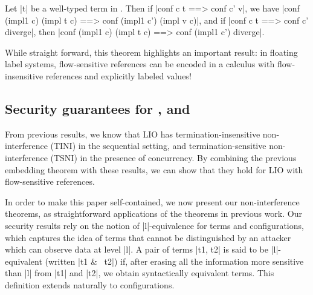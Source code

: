 


\begin{theorem}
\label{thm:eq} Let |t| be a well-typed term in \liofs{}.
  Then if |conf c t ==> conf c' v|, we have |conf (impl1 c) (impl t c)
  ==> conf (impl1 c') (impl v c)|, and if 
  |conf c t ==> conf c' diverge|, then
  |conf (impl1 c) (impl t c) ==> conf (impl1 c') diverge|.
\end{theorem}
While straight forward, this theorem highlights an important result: in
floating label systems, flow-sensitive references can be encoded in a calculus
with flow-insensitive references and explicitly labeled values!

\subsection{Security guarantees for \liofs{}, \lioafs{} and \lioconc{}}

From previous results, we know that LIO has termination-insensitive
non-interference (TINI) in the sequential setting, and termination-sensitive
non-interference (TSNI) in the presence of concurrency. By combining the previous
embedding theorem with these results, we can show that they hold for LIO with
flow-sensitive references.

In order to make this paper self-contained, we now present our
non-interference theorems, as straightforward applications of the theorems in
previous work. Our security results rely on the notion of
|l|-equivalence for terms and configurations, which captures the idea
of terms that cannot be distinguished by an attacker which can observe
data at level |l|. A pair of terms |t1, t2| is said to be
|l|-equivalent (written |t1 &~ t2|) if, after erasing all the
information more sensitive than |l| from |t1| and |t2|, we obtain
syntactically equivalent terms. This definition extends naturally to
configurations.

